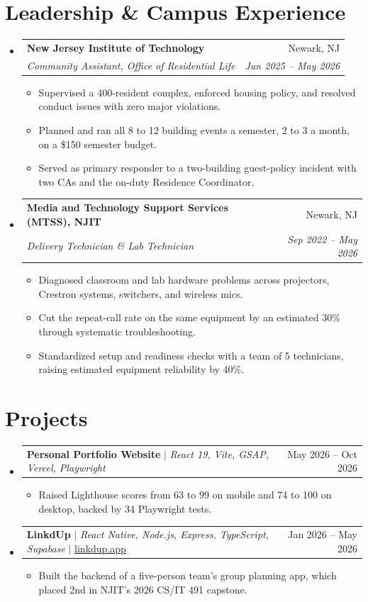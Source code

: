 \documentclass[letterpaper,11pt]{article}
\makeatletter
\newcommand{\resumeItem}[1]{\item\small{#1}}
\newcommand{\resumeSubheading}[4]{
  \vspace{-2pt}\item
    \begin{tabular*}{0.97\textwidth}[t]{l@{\extracolsep{\fill}}r}
      \textbf{#1} & #2 \\
      \textit{\small#3} & \textit{\small #4} \\
    \end{tabular*}\vspace{-7pt}
}
\newcommand{\resumeProjectHeading}[2]{
    \item
    \begin{tabular*}{0.97\textwidth}{l@{\extracolsep{\fill}}r}
      \small#1 & #2 \\
    \end{tabular*}\vspace{-7pt}
}
\newcommand{\resumeSubHeadingListStart}{\begin{itemize}[leftmargin=0.15in, label={}, itemsep=1pt, parsep=0pt, topsep=2pt]}
\newcommand{\resumeSubHeadingListEnd}{\end{itemize}}
\newcommand{\resumeItemListStart}{\begin{itemize}[topsep=6pt,itemsep=0pt,parsep=0pt,partopsep=0pt]}
\newcommand{\resumeItemListEnd}{\end{itemize}\vspace{-5pt}}
\makeatother
\begin{document}
\section{Leadership \& Campus Experience}
  \resumeSubHeadingListStart
    \resumeSubheading
      {New Jersey Institute of Technology}{Newark, NJ}
      {Community Assistant, Office of Residential Life}{Jun 2025 -- May 2026}
      \resumeItemListStart
        \resumeItem{Supervised a 400-resident complex, enforced housing policy, and resolved conduct issues with zero major violations.}
        \resumeItem{Planned and ran all 8 to 12 building events a semester, 2 to 3 a month, on a \$150 semester budget.}
        \resumeItem{Served as primary responder to a two-building guest-policy incident with two CAs and the on-duty Residence Coordinator.}
      \resumeItemListEnd
    \resumeSubheading
      {Media and Technology Support Services (MTSS), NJIT}{Newark, NJ}
      {Delivery Technician \& Lab Technician}{Sep 2022 -- May 2026}
      \resumeItemListStart
        \resumeItem{Diagnosed classroom and lab hardware problems across projectors, Crestron systems, switchers, and wireless mics.}
        \resumeItem{Cut the repeat-call rate on the same equipment by an estimated 30\% through systematic troubleshooting.}
        \resumeItem{Standardized setup and readiness checks with a team of 5 technicians, raising estimated equipment reliability by 40\%.}
      \resumeItemListEnd
  \resumeSubHeadingListEnd

\section{Projects}
    \resumeSubHeadingListStart
      \resumeProjectHeading
          {\textbf{Personal Portfolio Website} $|$ \emph{React 19, Vite, GSAP, Vercel, Playwright}}{May 2026 -- Oct 2026}
          \resumeItemListStart
            \resumeItem{Raised Lighthouse scores from 63 to 99 on mobile and 74 to 100 on desktop, backed by 34 Playwright tests.}
          \resumeItemListEnd
      \resumeProjectHeading
          {\textbf{LinkdUp} $|$ \emph{React Native, Node.js, Express, TypeScript, Supabase} $|$ \href{https://linkdup.app}{\underline{linkdup.app}}}{Jan 2026 -- May 2026}
          \resumeItemListStart
            \resumeItem{Built the backend of a five-person team's group planning app, which placed 2nd in NJIT's 2026 CS/IT 491 capstone.}
          \resumeItemListEnd
    \resumeSubHeadingListEnd
\end{document}

